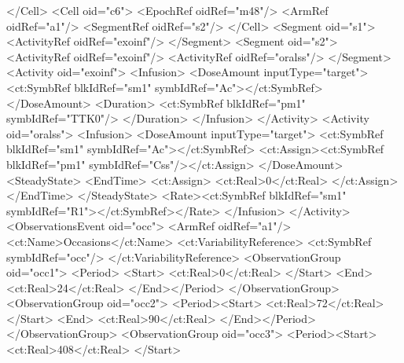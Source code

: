 \documentclass[a4paper,10pt]{article}
\begin{document}
\begin{xmlcode}
            </Cell>
            <Cell oid="c6">
                <EpochRef oidRef="m48"/>
                <ArmRef oidRef="a1"/>
                <SegmentRef oidRef="s2"/>
            </Cell>
            <Segment oid="s1">
                <ActivityRef oidRef="exoinf"/>
            </Segment>
            <Segment oid="s2">
                <ActivityRef oidRef="exoinf"/>
                <ActivityRef oidRef="oralss"/>
            </Segment>
            <Activity oid="exoinf">
                <Infusion>
                    <DoseAmount inputType="target">
                        <ct:SymbRef blkIdRef="sm1" symbIdRef="Ac"></ct:SymbRef>
                    </DoseAmount>
                    <Duration>
                        <ct:SymbRef blkIdRef="pm1" symbIdRef="TTK0"/>
                    </Duration>
                </Infusion>
            </Activity>
            <Activity oid="oralss">
                <Infusion>
                    <DoseAmount inputType="target">
                        <ct:SymbRef blkIdRef="sm1" symbIdRef="Ac"></ct:SymbRef>
                        <ct:Assign><ct:SymbRef blkIdRef="pm1" symbIdRef="Css"/></ct:Assign>
                    </DoseAmount>
                    <SteadyState>
                        <EndTime>
                            <ct:Assign>
                                <ct:Real>0</ct:Real>
                            </ct:Assign>
                        </EndTime>
                    </SteadyState>
                    <Rate><ct:SymbRef blkIdRef="sm1" symbIdRef="R1"></ct:SymbRef></Rate>
                </Infusion>
            </Activity>
            <ObservationsEvent oid="occ">
                <ArmRef oidRef="a1"/>
                <ct:Name>Occasions</ct:Name>
                <ct:VariabilityReference>
                    <ct:SymbRef symbIdRef="occ"/>
                </ct:VariabilityReference>
                <ObservationGroup oid="occ1">
                   <Period> <Start>
                        <ct:Real>0</ct:Real>
                    </Start>
                    <End>
                        <ct:Real>24</ct:Real>
                    </End></Period>
                </ObservationGroup>
                <ObservationGroup oid="occ2">
                    <Period><Start>
                        <ct:Real>72</ct:Real>
                    </Start>
                    <End>
                        <ct:Real>90</ct:Real>
                    </End></Period>
                </ObservationGroup>
                <ObservationGroup oid="occ3">
                    <Period><Start>
                        <ct:Real>408</ct:Real>
                    </Start>

\end{xmlcode}
\end{document}
